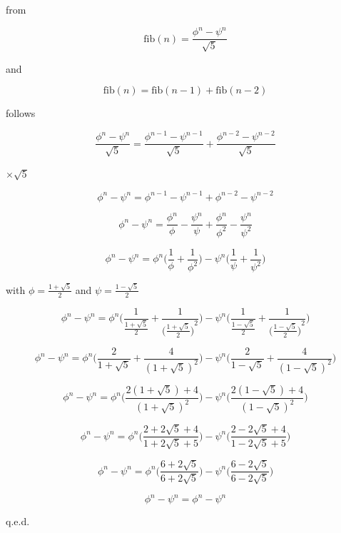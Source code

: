 \documentclass[a4paper,11pt]{scrartcl}
\begin{document}
from

$$ \text{fib}(n) = \frac{\phi^n - \psi^n}{\sqrt{5}} $$

and

$$ \text{fib}(n) = \text{fib}(n-1) + \text{fib}(n-2) $$

follows

$$ \frac{\phi^n - \psi^n}{\sqrt{5}} = \frac{\phi^{n-1} - \psi^{n-1}}{\sqrt{5}} + \frac{\phi^{n-2} - \psi^{n-2}}{\sqrt{5}} $$

$ \times \sqrt{5} $

$$ \phi^n - \psi^n = \phi^{n-1} - \psi^{n-1} + \phi^{n-2} - \psi^{n-2} $$

$$ \phi^n - \psi^n = \frac{\phi^n}{\phi} - \frac{\psi^n}{\psi} + \frac{\phi^n}{\phi^2} - \frac{\psi^n}{\psi^2} $$

$$ \phi^n - \psi^n = \phi^n \Big( \frac{1}{\phi} + \frac{1}{\phi^2} \Big) - \psi^n \Big( \frac{1}{\psi} + \frac{1}{\psi^2} \Big) $$

with $ \phi = \frac{1+\sqrt{5}}{2} $ and $ \psi = \frac{1-\sqrt{5}}{2} $

$$ \phi^n - \psi^n = \phi^n \Bigg( \frac{1}{\frac{1+\sqrt{5}}{2}} + \frac{1}{{\Big(\frac{1+\sqrt{5}}{2}\Big)}^2} \Bigg) - \psi^n \Bigg( \frac{1}{\frac{1-\sqrt{5}}{2}} + \frac{1}{{{\Big(\frac{1-\sqrt{5}}{2}}\Big)}^2} \Bigg) $$

$$ \phi^n - \psi^n = \phi^n \Bigg( \frac{2}{1+\sqrt{5}} + \frac{4}{(1+\sqrt{5})^2} \Bigg) - \psi^n \Bigg( \frac{2}{1-\sqrt{5}} + \frac{4}{(1-\sqrt{5})^2} \Bigg) $$

$$ \phi^n - \psi^n = \phi^n \Bigg( \frac{2(1+\sqrt{5})+4}{(1+\sqrt{5})^2} \Bigg) - \psi^n \Bigg( \frac{2(1-\sqrt{5})+4}{(1-\sqrt{5})^2} \Bigg) $$

$$ \phi^n - \psi^n = \phi^n \Bigg( \frac{2+2\sqrt{5}+4}{1+2\sqrt{5}+5} \Bigg) - \psi^n \Bigg( \frac{2-2\sqrt{5}+4}{1-2\sqrt{5}+5} \Bigg) $$

$$ \phi^n - \psi^n = \phi^n \Bigg( \frac{6+2\sqrt{5}}{6+2\sqrt{5}} \Bigg) - \psi^n \Bigg( \frac{6-2\sqrt{5}}{6-2\sqrt{5}} \Bigg) $$

$$ \phi^n - \psi^n = \phi^n - \psi^n $$

q.e.d.
\end{document}
